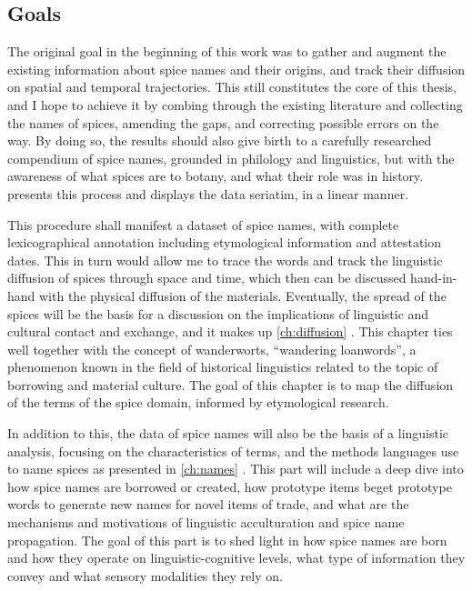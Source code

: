 \subsection{Goals}

The original goal in the beginning of this work was to gather and augment the existing information about spice names and their origins, and track their diffusion on spatial and temporal trajectories. This still constitutes the core of this thesis, and I hope to achieve it by combing through the existing literature and collecting the names of spices, amending the gaps, and correcting possible errors on the way. By doing so, the results should also give birth to a carefully researched compendium of spice names, grounded in philology and linguistics, but with the awareness of what spices are to botany, and what their role was in history.   presents this process and displays the data seriatim, in a linear manner. 

This procedure shall manifest a dataset of spice names, with complete lexicographical annotation including etymological information and attestation dates. This in turn would allow me to trace the words and track the linguistic diffusion of spices through space and time, which then can be discussed hand-in-hand with the physical diffusion of the materials. Eventually, the spread of the spices will be the basis for a discussion on the implications of linguistic and cultural contact and exchange, and it makes up \cref{ch:diffusion} . This chapter ties well together with the concept of \glspl{wanderwort}, ``wandering loanwords'', a phenomenon known in the field of historical linguistics related to the topic of borrowing and material culture. The goal of this chapter is to map the diffusion of the terms of the spice domain, informed by etymological research.

In addition to this, the data of spice names will also be the basis of a linguistic analysis, focusing on the characteristics of terms, and the methods languages use to name spices as presented in \cref{ch:names} . This part will include a deep dive into how spice names are borrowed or created, how prototype items beget prototype words to generate new names for novel items of trade, and what are the mechanisms and motivations of linguistic acculturation and spice name propagation. The goal of this part is to shed light in how spice names are born and how they operate on linguistic-cognitive levels, what type of information they convey and what sensory modalities they rely on.

